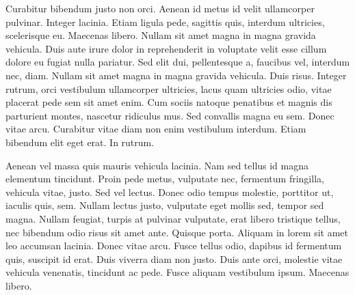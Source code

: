 \documentclass[english,master,dept460,male,cpp,cpdeclaration]{diploma}
\begin{document}
\begin{table}
	\centering
	\caption{An example of two very small tables grouped together}
	\label{tab:TopLevelTableLabel}
	\hspace{3em} %
\end{table}

Curabitur bibendum justo non orci. Aenean id metus id velit ullamcorper pulvinar. Integer lacinia. Etiam ligula pede, sagittis quis, interdum ultricies, scelerisque eu. Maecenas libero. Nullam sit amet magna in magna gravida vehicula. Duis aute irure dolor in reprehenderit in voluptate velit esse cillum dolore eu fugiat nulla pariatur. Sed elit dui, pellentesque a, faucibus vel, interdum nec, diam. Nullam sit amet magna in magna gravida vehicula. Duis risus. Integer rutrum, orci vestibulum ullamcorper ultricies, lacus quam ultricies odio, vitae placerat pede sem sit amet enim. Cum sociis natoque penatibus et magnis dis parturient montes, nascetur ridiculus mus. Sed convallis magna eu sem. Donec vitae arcu. Curabitur vitae diam non enim vestibulum interdum. Etiam bibendum elit eget erat. In rutrum.

Aenean vel massa quis mauris vehicula lacinia. Nam sed tellus id magna elementum tincidunt. Proin pede metus, vulputate nec, fermentum fringilla, vehicula vitae, justo. Sed vel lectus. Donec odio tempus molestie, porttitor ut, iaculis quis, sem. Nullam lectus justo, vulputate eget mollis sed, tempor sed magna. Nullam feugiat, turpis at pulvinar vulputate, erat libero tristique tellus, nec bibendum odio risus sit amet ante. Quisque porta. Aliquam in lorem sit amet leo accumsan lacinia. Donec vitae arcu. Fusce tellus odio, dapibus id fermentum quis, suscipit id erat. Duis viverra diam non justo. Duis ante orci, molestie vitae vehicula venenatis, tincidunt ac pede. Fusce aliquam vestibulum ipsum. Maecenas libero.
\end{document}
